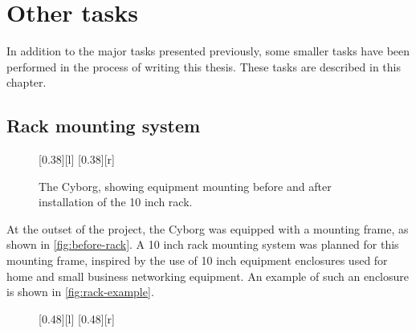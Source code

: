 \documentclass[\rootfolder/main.tex]{subfiles}
\begin{document}
\chapter{Other tasks}
\label{ch:other-tasks} %

In addition to the major tasks presented previously, some smaller tasks have been performed in the process of writing this thesis.
These tasks are described in this chapter.


\section{Rack mounting system}

\begin{figure}[h]
    \centering
    [0.38\columnwidth][l]{}
    [0.38\columnwidth][r]{}
    \caption{The Cyborg, showing equipment mounting before and after installation of the 10 inch rack.\label{fig:before-after-rack}}
\end{figure}

At the outset of the project, the Cyborg was equipped with a mounting frame, as shown in \cref{fig:before-rack}.
A 10 inch rack mounting system was planned for this mounting frame, inspired by the use of 10 inch equipment enclosures used for home and small business networking equipment.
An example of such an enclosure is shown in \cref{fig:rack-example}.

\begin{figure}[h]
    [0.48\columnwidth][l]{}
    [0.48\columnwidth][r]{}
\end{figure}
\end{document}
